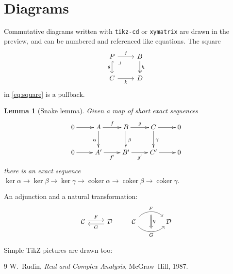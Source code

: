 \documentclass{amsart}
\newtheorem{lemma}[theorem]{Lemma}
\theoremstyle{definition}
\theoremstyle{remark}
\numberwithin{equation}{section}
\begin{document}
\section{Diagrams}\label{sec:diagrams}

Commutative diagrams written with \texttt{tikz-cd} or \texttt{xymatrix} are
drawn in the preview, and can be numbered and referenced like equations. The
square
\begin{equation}\label{eq:square}
\begin{tikzcd}
P \arrow[r, "f"] \arrow[d, "g"', hook] \arrow[dr, phantom, "\lrcorner", very near start] & B \arrow[d, "h", two heads] \\
C \arrow[r, "k"'] & D
\end{tikzcd}
\end{equation}
in \eqref{eq:square} is a pullback.

\begin{lemma}[Snake lemma]\label{lem:snake}
Given a map of short exact sequences
\[
\xymatrix{
0 \ar[r] & A \ar[r]^{f} \ar[d]_{\alpha} & B \ar[r]^{g} \ar[d]^{\beta} & C \ar[r] \ar[d]^{\gamma} & 0 \\
0 \ar[r] & A' \ar[r]_{f'} & B' \ar[r]_{g'} & C' \ar[r] & 0
}
\]
there is an exact sequence $\ker\alpha \to \ker\beta \to \ker\gamma \to \operatorname{coker}\alpha \to \operatorname{coker}\beta \to \operatorname{coker}\gamma$.
\end{lemma}

An adjunction and a natural transformation:
\[
\begin{tikzcd}
\mathcal{C} \arrow[r, shift left=1.2, "F"] & \mathcal{D} \arrow[l, shift left=1.2, "G"]
\end{tikzcd}
\qquad
\begin{tikzcd}[column sep=large]
\mathcal{C} \arrow[r, bend left=45, "F", ""{name=U, below}] \arrow[r, bend right=45, "G"', ""{name=D}] & \mathcal{D}
\arrow[Rightarrow, from=U, to=D, "\eta"]
\end{tikzcd}
\]

Simple TikZ pictures are drawn too:
\begin{center}
\end{center}

\begin{thebibliography}{9}
 W.~Rudin, \emph{Real and Complex Analysis}, McGraw--Hill, 1987.
\end{thebibliography}
\end{document}
